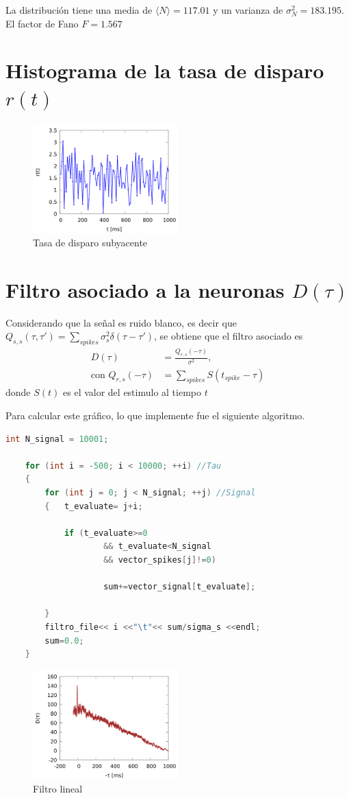 La distribución tiene una media de $\langle N \rangle = 117.01$ y un varianza de $\sigma^2_{N}=183.195$.
El factor de Fano $F=1.567$


\section*{Histograma de la tasa de disparo \texorpdfstring{$r(t)$}{}}


\begin{figure}[H]
	\centering
	\includegraphics[width=0.5\textwidth]{../Graficos/r_t.png}
	\caption{Tasa de disparo subyacente}
\end{figure}

\section*{Filtro asociado a la neuronas \texorpdfstring{$D(\tau)$}{}}


Considerando que la señal es ruido blanco, es decir que $Q_{s,s}(\tau, \tau')= \sum_{spikes} \sigma^2_s \delta(\tau-\tau')$, se obtiene que el filtro asociado es 
\begin{align}
    D(\tau) &= \frac{Q_{r,s}(-\tau)}{\sigma^2}, \\
    \text{con } Q_{r,s}(-\tau) &= \sum_{spikes} S(t_{spike} - \tau)
\end{align}
donde $S(t)$ es el valor del estimulo al tiempo $t$

Para calcular este gráfico, lo que implemente fue el siguiente algoritmo.

\begin{lstlisting}[language=C++]
	int N_signal = 10001;

	for (int i = -500; i < 10000; ++i) //Tau
	{
		for (int j = 0; j < N_signal; ++j) //Signal
		{	t_evaluate= j+i;
			
			if (t_evaluate>=0 
					&& t_evaluate<N_signal 
					&& vector_spikes[j]!=0) 

					sum+=vector_signal[t_evaluate];
				
		}
		filtro_file<< i <<"\t"<< sum/sigma_s <<endl;
		sum=0.0;
	}
\end{lstlisting}


\begin{figure}[H]
	\centering
	\includegraphics[width=0.5\textwidth]{../Graficos/D_tau.png}
	\caption{Filtro lineal}
\end{figure}




